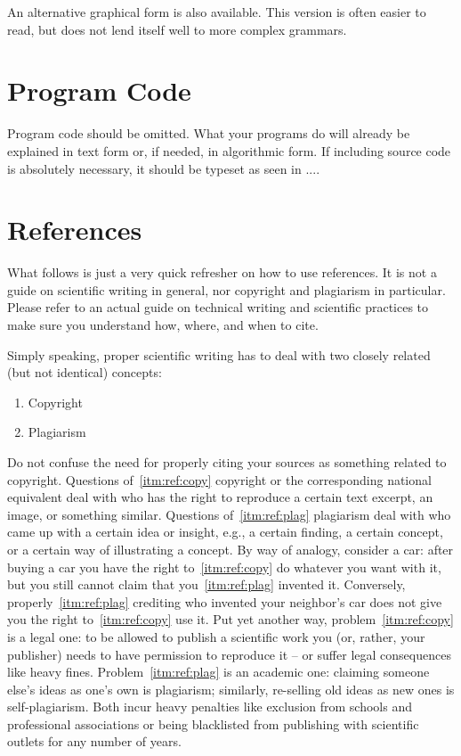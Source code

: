 \documentclass[]{ccs-thesis}
\begin{document}
{\begin{grammar}
\end{grammar}

An alternative graphical form is also available.
This version is often easier to read, but does not lend itself well to more complex grammars.


\clearpage
\section{Program Code}

Program code should be omitted.
What your programs do will already be explained in text form or, if needed, in algorithmic form.
If including source code is absolutely necessary, it should be typeset as seen in ....

\clearpage
\section{References}

What follows is just a very quick refresher on how to use references.
It is not a guide on scientific writing in general, nor copyright and plagiarism in particular.
Please refer to an actual guide on technical writing and scientific practices to make sure you understand how, where, and when to cite.

Simply speaking, proper scientific writing has to deal with two closely related (but not identical) concepts:
\begin{enumerate}[label=\alph*),ref=(\alph*)]
\item\label{itm:ref:copy}
Copyright
\item
Plagiarism\label{itm:ref:plag}
\end{enumerate}
Do not confuse the need for properly citing your sources as something related to copyright.
Questions of~\ref{itm:ref:copy} copyright or the corresponding national equivalent deal with who has the right to reproduce a certain text excerpt, an image, or something similar.
Questions of~\ref{itm:ref:plag} plagiarism deal with who came up with a certain idea or insight, e.g., a certain finding, a certain concept, or a certain way of illustrating a concept.
By way of analogy, consider a car: after buying a car you have the right to~\ref{itm:ref:copy} do whatever you want with it, but you still cannot claim that you~\ref{itm:ref:plag} invented it.
Conversely, properly~\ref{itm:ref:plag} crediting who invented your neighbor's car does not give you the right to~\ref{itm:ref:copy} use it.
Put yet another way, problem~\ref{itm:ref:copy} is a legal one: to be allowed to publish a scientific work you (or, rather, your publisher) needs to have permission to reproduce it -- or suffer legal consequences like heavy fines.
Problem~\ref{itm:ref:plag} is an academic one: claiming someone else's ideas as one's own is plagiarism; similarly, re-selling old ideas as new ones is self-plagiarism.
Both incur heavy penalties like exclusion from schools and professional associations or being blacklisted from publishing with scientific outlets for any number of years.

}
\end{document}

